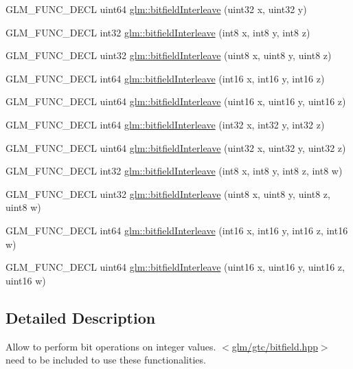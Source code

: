 \begin{DoxyCompactItemize}
\item 
G\-L\-M\-\_\-\-F\-U\-N\-C\-\_\-\-D\-E\-C\-L uint64 \hyperlink{group__gtc__bitfield_ga2bc87fd66f6f8471c1a46888360cef12}{glm\-::bitfield\-Interleave} (uint32 x, uint32 y)
\item 
G\-L\-M\-\_\-\-F\-U\-N\-C\-\_\-\-D\-E\-C\-L int32 \hyperlink{group__gtc__bitfield_ga6dee2ce1c45805063bb7fc5f6fd8f5ca}{glm\-::bitfield\-Interleave} (int8 x, int8 y, int8 z)
\item 
G\-L\-M\-\_\-\-F\-U\-N\-C\-\_\-\-D\-E\-C\-L uint32 \hyperlink{group__gtc__bitfield_gab9d593a2e916beb8f8137a0dbeae3afe}{glm\-::bitfield\-Interleave} (uint8 x, uint8 y, uint8 z)
\item 
G\-L\-M\-\_\-\-F\-U\-N\-C\-\_\-\-D\-E\-C\-L int64 \hyperlink{group__gtc__bitfield_gaf898f842ac089fcc8d6201c32702584a}{glm\-::bitfield\-Interleave} (int16 x, int16 y, int16 z)
\item 
G\-L\-M\-\_\-\-F\-U\-N\-C\-\_\-\-D\-E\-C\-L uint64 \hyperlink{group__gtc__bitfield_ga3c170e2ec54f2faab5e1c5bb693d718d}{glm\-::bitfield\-Interleave} (uint16 x, uint16 y, uint16 z)
\item 
G\-L\-M\-\_\-\-F\-U\-N\-C\-\_\-\-D\-E\-C\-L int64 \hyperlink{group__gtc__bitfield_ga64e2d84f6560af3cc639644b1e628c42}{glm\-::bitfield\-Interleave} (int32 x, int32 y, int32 z)
\item 
G\-L\-M\-\_\-\-F\-U\-N\-C\-\_\-\-D\-E\-C\-L uint64 \hyperlink{group__gtc__bitfield_ga7c10eb37f608365cfaef5ca2c476e1ce}{glm\-::bitfield\-Interleave} (uint32 x, uint32 y, uint32 z)
\item 
G\-L\-M\-\_\-\-F\-U\-N\-C\-\_\-\-D\-E\-C\-L int32 \hyperlink{group__gtc__bitfield_ga7da84ecc2b3a46c9c08a9f40012359cf}{glm\-::bitfield\-Interleave} (int8 x, int8 y, int8 z, int8 w)
\item 
G\-L\-M\-\_\-\-F\-U\-N\-C\-\_\-\-D\-E\-C\-L uint32 \hyperlink{group__gtc__bitfield_ga447c0bbed9d60c14578626d8f03f3755}{glm\-::bitfield\-Interleave} (uint8 x, uint8 y, uint8 z, uint8 w)
\item 
G\-L\-M\-\_\-\-F\-U\-N\-C\-\_\-\-D\-E\-C\-L int64 \hyperlink{group__gtc__bitfield_ga09ee0be0fac790a1607a711e597dd9bf}{glm\-::bitfield\-Interleave} (int16 x, int16 y, int16 z, int16 w)
\item 
G\-L\-M\-\_\-\-F\-U\-N\-C\-\_\-\-D\-E\-C\-L uint64 \hyperlink{group__gtc__bitfield_gac8a926a7bfd9b23c22a4f685193fbfe1}{glm\-::bitfield\-Interleave} (uint16 x, uint16 y, uint16 z, uint16 w)
\end{DoxyCompactItemize}


\subsection{Detailed Description}
Allow to perform bit operations on integer values. $<$\hyperlink{bitfield_8hpp}{glm/gtc/bitfield.\-hpp}$>$ need to be included to use these functionalities. 

